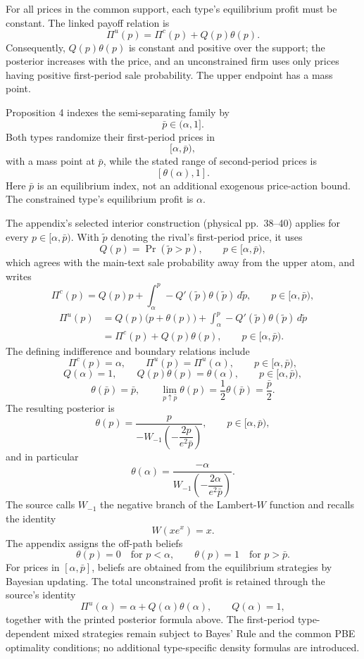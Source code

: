 \documentclass{article}
\begin{document}
For all prices in the common support, each type's equilibrium profit must be constant. The linked payoff relation is
\[
\Pi^{u}(p)=\Pi^{c}(p)+Q(p)\theta(p).
\]
Consequently, $Q(p)\theta(p)$ is constant and positive over the support; the posterior increases with the price, and an unconstrained firm uses only prices having positive first-period sale probability. The upper endpoint has a mass point.

Proposition 4 indexes the semi-separating family by
\[
\bar p\in(\alpha,1].
\]
Both types randomize their first-period prices in
\[
[\alpha,\bar p),
\]
with a mass point at $\bar p$, while the stated range of second-period prices is
\[
[\theta(\alpha),1].
\]
Here $\bar p$ is an equilibrium index, not an additional exogenous price-action bound. The constrained type's equilibrium profit is $\alpha$.

The appendix's selected interior construction (physical pp.~38--40) applies for every $p\in[\alpha,\bar p)$. With $\tilde p$ denoting the rival's first-period price, it uses
\[
Q(p)=\Pr(\tilde p>p),\qquad p\in[\alpha,\bar p),
\]
which agrees with the main-text sale probability away from the upper atom, and writes
\[
\Pi^{c}(p)=Q(p)p+
\int_{\alpha}^{p}-Q'(\tilde p)\theta(\tilde p)\,d\tilde p,
\qquad p\in[\alpha,\bar p),
\]
\[
\begin{aligned}
\Pi^{u}(p)
 &=Q(p)\bigl(p+\theta(p)\bigr)
   +\int_{\alpha}^{p}-Q'(\tilde p)\theta(\tilde p)\,d\tilde p\\
 &=\Pi^{c}(p)+Q(p)\theta(p),
\qquad p\in[\alpha,\bar p).
\end{aligned}
\]
The defining indifference and boundary relations include
\[
\Pi^{c}(p)=\alpha,
\qquad
\Pi^{u}(p)=\Pi^{u}(\alpha),
\qquad p\in[\alpha,\bar p),
\]
\[
Q(\alpha)=1,
\qquad
Q(p)\theta(p)=\theta(\alpha),
\qquad p\in[\alpha,\bar p),
\]
\[
\theta(\bar p)=\bar p,
\qquad
\lim_{p\uparrow\bar p}\theta(p)
 =\frac{1}{2}\theta(\bar p)=\frac{\bar p}{2}.
\]
The resulting posterior is
\[
\theta(p)=
\frac{p}{-W_{-1}\!\left(-\dfrac{2p}{e^{2}\bar p}\right)},
\qquad p\in[\alpha,\bar p),
\]
and in particular
\[
\theta(\alpha)=
\frac{-\alpha}{W_{-1}\!\left(-\dfrac{2\alpha}{e^{2}\bar p}\right)}.
\]
The source calls $W_{-1}$ the negative branch of the Lambert-$W$ function and recalls the identity
\[
W(xe^{x})=x.
\]
The appendix assigns the off-path beliefs
\[
\theta(p)=0\quad\text{for }p<\alpha,
\qquad
\theta(p)=1\quad\text{for }p>\bar p.
\]
For prices in $[\alpha,\bar p]$, beliefs are obtained from the equilibrium strategies by Bayesian updating. The total unconstrained profit is retained through the source's identity
\[
\Pi^{u}(\alpha)=\alpha+Q(\alpha)\theta(\alpha),
\qquad Q(\alpha)=1,
\]
together with the printed posterior formula above. The first-period type-dependent mixed strategies remain subject to Bayes' Rule and the common PBE optimality conditions; no additional type-specific density formulas are introduced.
\end{document}
